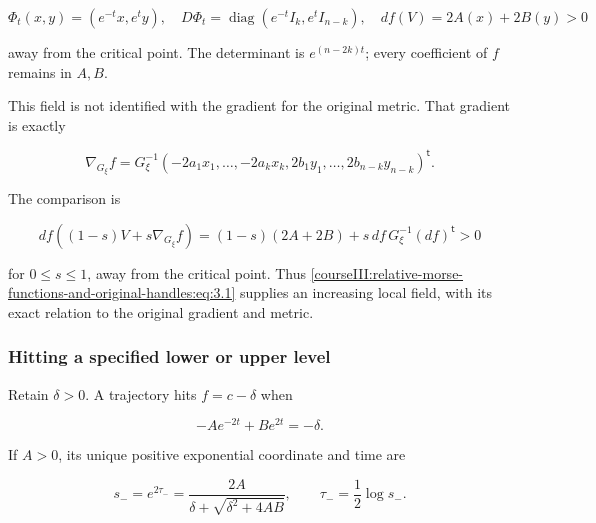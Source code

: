 \begin{equation}
\Phi_t(x,y)=(e^{-t}x,e^t y),\quad
D\Phi_t=\operatorname{diag}(e^{-t}I_k,e^tI_{n-k}),\quad
df(V)=2A(x)+2B(y)>0
\label{courseIII:relative-morse-functions-and-original-handles:eq:3.2}
\end{equation}

away from the critical point. The determinant is \(e^{(n-2k)t}\); every coefficient of \(f\) remains in \(A,B\).

This field is not identified with the gradient for the original metric. That gradient is exactly

\begin{equation}
\nabla_{G_\xi}f
=G_\xi^{-1}(-2a_1x_1,\ldots,-2a_kx_k,
           2b_1y_1,\ldots,2b_{n-k}y_{n-k})^{\mathsf t}.
\label{courseIII:relative-morse-functions-and-original-handles:eq:3.3}
\end{equation}

The comparison is

\begin{equation}
df((1-s)V+s\nabla_{G_\xi}f)
=(1-s)(2A+2B)+s\,df\,G_\xi^{-1}(df)^{\mathsf t}>0
\label{courseIII:relative-morse-functions-and-original-handles:eq:3.4}
\end{equation}

for \(0\leq s\leq1\), away from the critical point. Thus \eqref{courseIII:relative-morse-functions-and-original-handles:eq:3.1} supplies an increasing local field, with its exact relation to the original gradient and metric.

\subsubsection{Hitting a specified lower or upper level}
\label{courseIII:relative-morse-functions-and-original-handles:section-3.2}

Retain \(\delta>0\). A trajectory hits \(f=c-\delta\) when

\begin{equation}
-Ae^{-2t}+Be^{2t}=-\delta.
\label{courseIII:relative-morse-functions-and-original-handles:eq:3.5}
\end{equation}

If \(A>0\), its unique positive exponential coordinate and time are

\begin{equation}
s_-=e^{2\tau_-}
=\frac{2A}{\delta+\sqrt{\delta^2+4AB}},
\qquad
\tau_-=\frac12\log s_-.
\label{courseIII:relative-morse-functions-and-original-handles:eq:3.6}
\end{equation}

